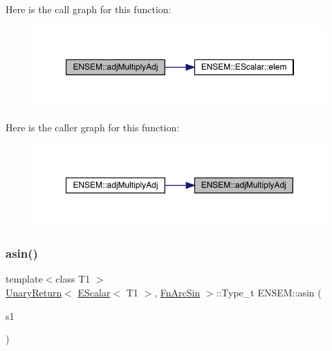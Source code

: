 Here is the call graph for this function\+:\nopagebreak
\begin{figure}[H]
\begin{center}
\leavevmode
\includegraphics[width=350pt]{d4/dca/group__escalar_gab3c0c146aa415c32cb9ce5a6ad426d10_cgraph}
\end{center}
\end{figure}
Here is the caller graph for this function\+:\nopagebreak
\begin{figure}[H]
\begin{center}
\leavevmode
\includegraphics[width=350pt]{d4/dca/group__escalar_gab3c0c146aa415c32cb9ce5a6ad426d10_icgraph}
\end{center}
\end{figure}
\mbox{\label{group__escalar_gab463bdb3f1fadf6b5a87076e5d3dc9b9}} 
\subsubsection{\texorpdfstring{asin()}{asin()}}
{\footnotesize\ttfamily template$<$class T1 $>$ \\
\mbox{\hyperlink{structENSEM_1_1UnaryReturn}{Unary\+Return}}$<$ \mbox{\hyperlink{classENSEM_1_1EScalar}{E\+Scalar}}$<$ T1 $>$, \mbox{\hyperlink{structENSEM_1_1FnArcSin}{Fn\+Arc\+Sin}} $>$\+::Type\+\_\+t E\+N\+S\+E\+M\+::asin (\begin{DoxyParamCaption}\item[{const \mbox{\hyperlink{classENSEM_1_1EScalar}{E\+Scalar}}$<$ T1 $>$ \&}]{s1 }\end{DoxyParamCaption})\hspace{0.3cm}{\ttfamily [inline]}}


